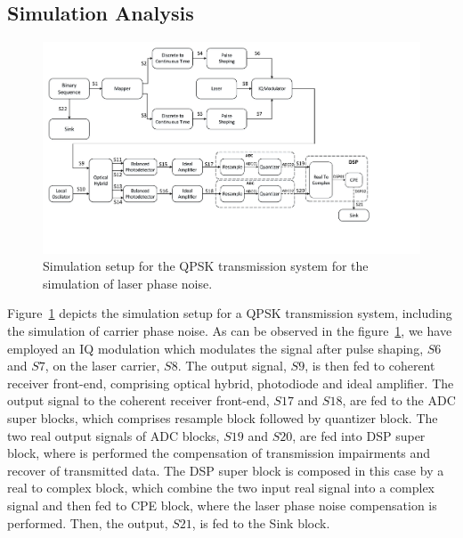 \begin{refsection}
\subsection{Simulation Analysis}
\begin{figure}[h!]
    \centering
    \includegraphics[width=15cm]{./sdf/dsp_laser_phase_compensation/figures/qpsk_transmitter_simulation.pdf}
    \caption{Simulation setup for the QPSK transmission system for the simulation of laser phase noise.}
    \label{fig_QPSKsystemLPN}
\end{figure}

Figure~\ref{fig_QPSKsystemLPN} depicts the simulation setup for a QPSK transmission system, including the simulation of carrier phase noise. As can be observed in the figure~\ref{fig_QPSKsystemLPN}, we have employed an IQ modulation which modulates the signal after pulse shaping, $S6$ and $S7$, on the laser carrier, $S8$. The output signal, $S9$, is then fed to coherent receiver front-end, comprising optical hybrid, photodiode and ideal amplifier. The output signal to the coherent receiver front-end, $S17$ and $S18$, are fed to the ADC super blocks, which comprises resample block followed by quantizer block. The two real output signals of ADC blocks, $S19$ and $S20$, are fed into DSP super block, where is performed the compensation of transmission impairments and recover of transmitted data. The DSP super block is composed in this case by a real to complex block, which combine the two input real signal into a complex signal and then fed to CPE block, where the laser phase noise compensation is performed. Then, the output, $S21$, is fed to the Sink block.

%
%
%


\end{refsection}
